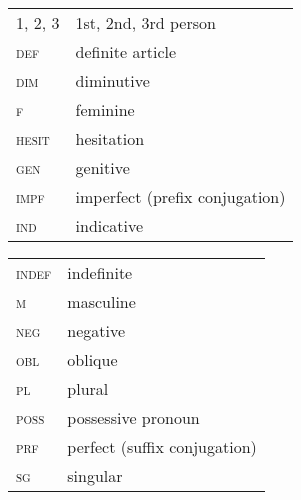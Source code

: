 \documentclass[output=paper]{langsci/langscibook}
\begin{document}
\begin{tabularx}{.5\textwidth}{@{}lQ@{}}
\textsc{1, 2, 3} & 1st, 2nd, 3rd person \\
\textsc{def} & definite article \\
\textsc{dim} & diminutive \\
\textsc{f} & feminine \\
\textsc{hesit} & hesitation \\
\textsc{gen} & genitive \\
\textsc{impf} & imperfect (prefix conjugation) \\
\textsc{ind} & indicative \\
\end{tabularx}%
\begin{tabularx}{.5\textwidth}{@{}lQ@{}}
\textsc{indef} & indefinite \\
\textsc{m} & masculine \\
\textsc{neg} & negative \\
\textsc{obl} & oblique \\
\textsc{pl} & plural \\
\textsc{poss} & possessive pronoun \\
\textsc{prf} & perfect (suffix conjugation) \\
\textsc{sg} & singular \\
\end{tabularx}%


\sloppy\printbibliography[heading=subbibliography,notkeyword=this]
\end{document}
